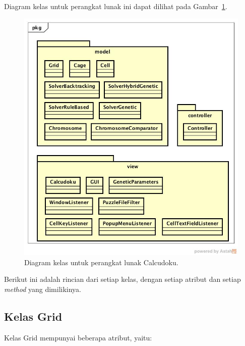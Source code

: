Diagram kelas untuk perangkat lunak ini dapat dilihat pada Gambar~\ref{fig:diagramkelas}.

\begin{figure}
\centering
\captionsetup{justification=centering}
\includegraphics[scale=0.5]{Gambar/Perancangan/DiagramKelas.jpg}
\caption[Diagram kelas untuk perangkat lunak Calcudoku.]{Diagram kelas untuk perangkat lunak Calcudoku.}
\label{fig:diagramkelas}
\end{figure}

Berikut ini adalah rincian dari setiap kelas, dengan setiap atribut dan setiap \textit{method} yang dimilikinya.

\subsection{Kelas Grid}
\label{sec:kelasgrid}

Kelas Grid mempunyai beberapa atribut, yaitu:

